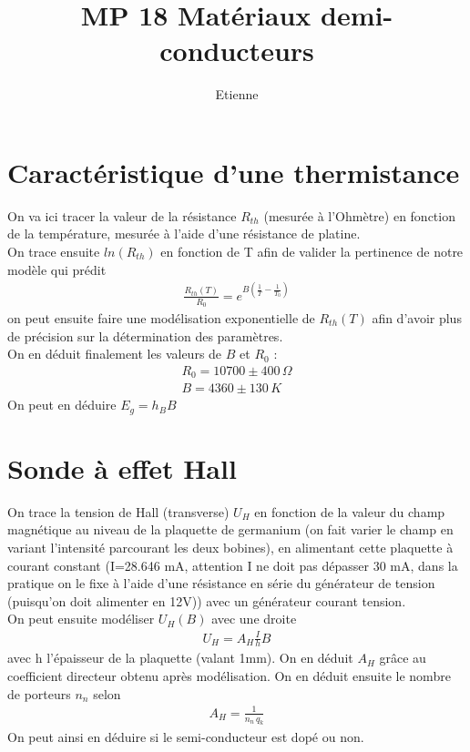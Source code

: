 \documentclass[12pt,prb,aps,epsf]{report}
\begin{document}
	
	\title{MP 18 Matériaux demi-conducteurs}
	\author{Etienne}
	
	\maketitle
	
	\tableofcontents
	
	\pagebreak
	
	
\section{Caractéristique d'une thermistance}	
	On va ici tracer la valeur de la résistance $R_{th}$ (mesurée à l'Ohmètre) en fonction de la température, mesurée à l'aide d'une résistance de platine.\\
	On trace ensuite $ln(R_{th})$ en fonction de T afin de valider la pertinence de notre modèle qui prédit 
	\begin{eqnarray}
	\frac{R_{th}(T)}{R_0} = e^{B(\frac{1}{T}-\frac{1}{T_0})}
	\end{eqnarray}
	on peut ensuite faire une modélisation exponentielle de $R_{th}(T)$ afin d'avoir plus de précision sur la détermination des paramètres.\\
	On en déduit finalement les valeurs de $B$ et $R_0$ : 
	\begin{eqnarray}
	R_0 = 10700 \pm 400\, \Omega\\
	B = 4360 \pm 130\, K
	\end{eqnarray}
	On peut en déduire $E_g = h_BB$
	
\section{Sonde à effet Hall}
On trace la tension de Hall (transverse) $U_H$ en fonction de la valeur du champ magnétique au niveau de la plaquette de germanium (on fait varier le champ en variant l'intensité parcourant les deux bobines), en alimentant cette plaquette à courant constant (I=28.646 mA, attention I ne doit pas dépasser 30 mA, dans la pratique on le fixe à l'aide d'une résistance en série du générateur de tension (puisqu'on doit alimenter en 12V)) avec un générateur courant tension.\\
On peut ensuite modéliser $U_H(B)$ avec une droite
\begin{eqnarray}
	U_H =A_H \frac{I}{h} B 
\end{eqnarray}
avec h l'épaisseur de la plaquette (valant 1mm). On en déduit $A_H$ grâce au coefficient directeur obtenu après modélisation. On en déduit ensuite le nombre de porteurs $n_n$ selon 
\begin{eqnarray}
A_H = \frac{1}{n_n\,q_k}
\end{eqnarray}
On peut ainsi en déduire si le semi-conducteur est dopé ou non.
\end{document}
